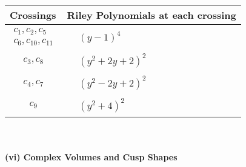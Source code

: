 \documentclass[1p]{elsarticle_modified}
\theoremstyle{definition}
\begin{document}
\begin{tabular}{m{50pt}|m{274pt}}
Crossings & \hspace{64pt}Riley Polynomials at each crossing \\
\hline $$\begin{aligned}c_{1},c_{2},c_{5}\\c_{6},c_{10},c_{11}\end{aligned}$$&$\begin{aligned}
&(y-1)^4
\end{aligned}$\\
\hline $$\begin{aligned}c_{3},c_{8}\end{aligned}$$&$\begin{aligned}
&(y^2+2 y+2)^2
\end{aligned}$\\
\hline $$\begin{aligned}c_{4},c_{7}\end{aligned}$$&$\begin{aligned}
&(y^2-2 y+2)^2
\end{aligned}$\\
\hline $$\begin{aligned}c_{9}\end{aligned}$$&$\begin{aligned}
&(y^2+4)^2
\end{aligned}$\\
\hline
\end{tabular}\\~\\
\newpage\flushleft \textbf{(vi) Complex Volumes and Cusp Shapes}
\end{document}
